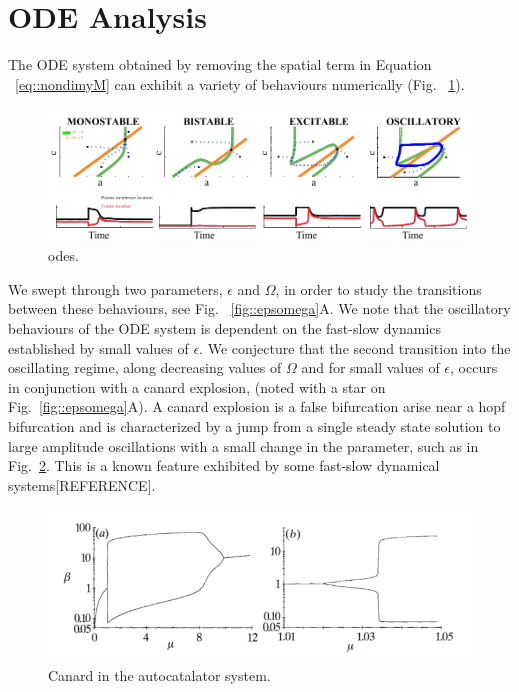 \section{ODE Analysis}

The ODE system obtained by removing the spatial term in Equation ~\ref{eq::nondimyM} can exhibit a variety of behaviours numerically (Fig. ~\ref{fig::odeanal}). 
\begin{figure}[h]
\centering
\captionsetup{width=\linewidth}
\includegraphics[width=4.5in]{Project2/figs/ODE_Analysis.pdf}
\caption{odes.}
\label{fig::odeanal}
\end{figure}

We swept through two parameters, $\epsilon$ and $\Omega$, in order to study the transitions between these behaviours, see Fig. ~\ref{fig::epsomega}A. We note that the oscillatory behaviours of the ODE system is dependent on the fast-slow dynamics established by small values of $\epsilon$. We conjecture that the second transition into the oscillating regime, along decreasing values of $\Omega$ and for small values of $\epsilon$, occurs in conjunction with a canard explosion, (noted with a star on Fig.~\ref{fig::epsomega}A). A canard explosion is a false bifurcation arise near a hopf bifurcation and is characterized by a jump from a single steady state solution to large amplitude oscillations with a small change in the parameter, such as in Fig.~\ref{fig::canard}. This is a known feature exhibited by some fast-slow dynamical systems[REFERENCE].

\begin{figure}[h]
\centering
\captionsetup{width=\linewidth}
\includegraphics[width=4.5in]{Project2/figs/canardfrompaper.pdf}
\caption{Canard in the autocatalator system.}
\label{fig::canard}
\end{figure}



